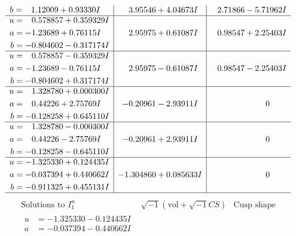 \documentclass[1p]{elsarticle_modified}
\theoremstyle{definition}
\newcommand{\I}{\sqrt{-1}}
\begin{document}
$$\begin{array}{c|c|c}
\begin{aligned}
b &= \phantom{-}1.12009 + 0.93330 I\end{aligned}
 & \phantom{-}3.95546 + 4.04673 I & \phantom{-}2.71866 - 5.71962 I \\ \hline\begin{aligned}
u &= \phantom{-}0.578857 + 0.359329 I \\
a &= -1.23689 + 0.76115 I \\
b &= -0.804602 - 0.317174 I\end{aligned}
 & \phantom{-}2.95975 + 0.61087 I & \phantom{-}0.98547 + 2.25403 I \\ \hline\begin{aligned}
u &= \phantom{-}0.578857 - 0.359329 I \\
a &= -1.23689 - 0.76115 I \\
b &= -0.804602 + 0.317174 I\end{aligned}
 & \phantom{-}2.95975 - 0.61087 I & \phantom{-}0.98547 - 2.25403 I \\ \hline\begin{aligned}
u &= \phantom{-}1.328780 + 0.000300 I \\
a &= \phantom{-}0.44226 + 2.75769 I \\
b &= -0.128258 + 0.645110 I\end{aligned}
 & -0.20961 - 2.93911 I & \phantom{-0.000000 } 0 \\ \hline\begin{aligned}
u &= \phantom{-}1.328780 - 0.000300 I \\
a &= \phantom{-}0.44226 - 2.75769 I \\
b &= -0.128258 - 0.645110 I\end{aligned}
 & -0.20961 + 2.93911 I & \phantom{-0.000000 } 0 \\ \hline\begin{aligned}
u &= -1.325330 + 0.124435 I \\
a &= -0.037394 + 0.440662 I \\
b &= -0.911325 + 0.455131 I\end{aligned}
 & -1.304860 + 0.085633 I & \phantom{-0.000000 } 0\\
 \hline 
 \end{array}$$\newpage$$\begin{array}{c|c|c}  
\text{Solutions to }I^u_{1}& \I (\text{vol} + \sqrt{-1}CS) & \text{Cusp shape}\\
 \hline 
\begin{aligned}
u &= -1.325330 - 0.124435 I \\
a &= -0.037394 - 0.440662 I \\

\end{aligned}
\end{array}$$
\end{document}
